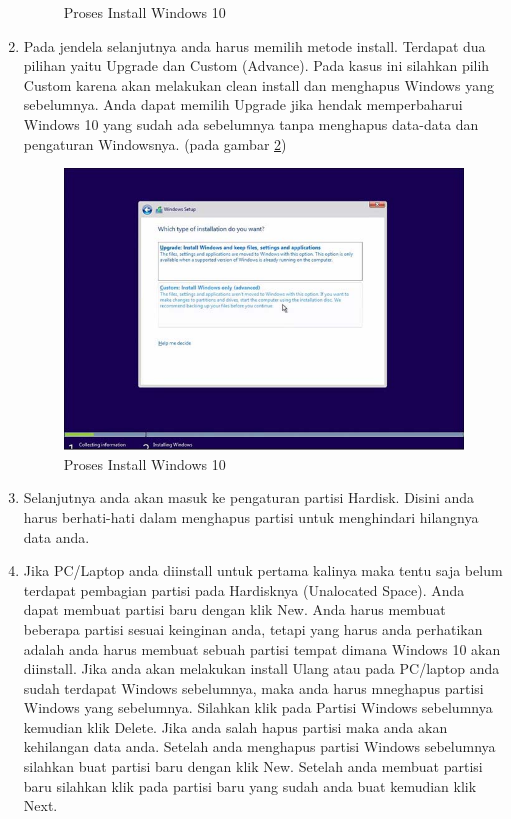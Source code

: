 \begin{enumerate}
\begin{figure}[h!]
	\caption{Proses Install Windows 10}
	\label{labelgambar10}
	\end{figure}
\item Pada jendela selanjutnya anda harus memilih metode install. Terdapat dua pilihan yaitu Upgrade dan Custom (Advance). Pada kasus ini silahkan pilih Custom karena akan melakukan clean install dan menghapus Windows yang sebelumnya. Anda dapat memilih Upgrade jika hendak memperbaharui Windows 10 yang sudah ada sebelumnya tanpa menghapus data-data dan pengaturan Windowsnya. (pada gambar \ref{labelgambar11})
    \begin{figure}[h!]
	\centering
	\includegraphics[scale=0.4]{figures/5.JPG}
	\caption{Proses Install Windows 10}
	\label{labelgambar11}
	\end{figure}
\item Selanjutnya anda akan masuk ke pengaturan partisi Hardisk. Disini anda harus berhati-hati dalam menghapus partisi untuk menghindari hilangnya data anda.
\item Jika PC/Laptop anda diinstall untuk pertama kalinya maka tentu saja belum terdapat pembagian partisi pada Hardisknya (Unalocated Space). Anda dapat membuat partisi baru dengan klik New. Anda harus membuat beberapa partisi sesuai keinginan anda, tetapi yang harus anda perhatikan adalah anda harus membuat sebuah partisi tempat dimana Windows 10 akan diinstall. Jika anda akan melakukan install Ulang atau pada PC/laptop anda sudah terdapat Windows sebelumnya, maka anda harus mneghapus partisi Windows yang sebelumnya. Silahkan klik pada Partisi Windows sebelumnya kemudian klik Delete. Jika anda salah hapus partisi maka anda akan kehilangan data anda. Setelah anda menghapus partisi Windows sebelumnya silahkan buat partisi baru dengan klik New. Setelah anda membuat partisi baru silahkan klik pada partisi baru yang sudah anda buat kemudian klik Next.

\end{enumerate}

